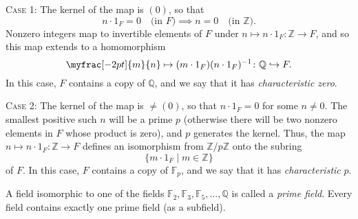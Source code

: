 \documentclass[a4paper,11pt,final,openany]{memoir}
\theoremstyle{nonumberplain}
\begin{document}
\textsc{Case 1:\/} The kernel of the map is $(0)$, so that
\[
n\cdot1_{F}=0\quad\text{(in }F\text{)}\implies n=0\quad\text{(in }%
\mathbb{Z}\text{).}%
\]
Nonzero integers map to invertible elements of $F$ under $n\mapsto n\cdot
1_{F}\colon\mathbb{Z}{}\rightarrow F$, and so this map extends to a
homomorphism
\[
\myfrac[-2pt]{m}{n}\mapsto(m\cdot1_{F})(n\cdot1_{F})^{-1}\colon\mathbb{Q}%
\hookrightarrow F.
\]
In this case, $F$ contains a copy of $\mathbb{Q}$, and we say that it has
\emph{characteristic zero}.%
%


\textsc{Case 2:}\emph{\/} The kernel of the map is $\neq(0)$, so that
$n\cdot1_{F}=0$ for some $n\neq0$. The smallest positive such $n$ will be a
prime $p$ (otherwise there will be two nonzero elements in $F$ whose product
is zero), and $p$ generates the kernel. Thus, the map $n\mapsto n\cdot
1_{F}\colon\mathbb{Z}{}\rightarrow F$ defines an isomorphism from
$\mathbb{Z}/p\mathbb{Z}{}$ onto the subring
\[
\{m\cdot1_{F}\mid m\in\mathbb{Z}\}
\]
of $F$. In this case, $F$ contains a copy of $\mathbb{F}_{p}$, and we say that
it has \emph{characteristic} $p$.%
%


A field isomorphic to one of the fields $\mathbb{F}_{2},\mathbb{F}{}%
_{3},\mathbb{F}{}_{5},\ldots,\mathbb{Q}$ is called a \emph{prime field}.%
Every field contains exactly one prime field (as a subfield).
\end{document}

